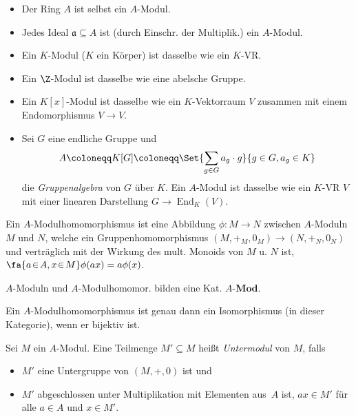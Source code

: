 \documentclass{cheat-sheet}
\newcommand{\Mod}{\mathbf{Mod}} %
\newcommand{\LMod}[1]{{#1}\text{-}\Mod} %
\DeclareMathOperator{\Hom}{Hom} %
\DeclareMathOperator{\End}{End} %
\newcommand{\aaa}{\mathfrak{a}}
\begin{document}
\begin{bspe}
  \begin{itemize}
    \item Der Ring $A$ ist selbst ein $A$-Modul.
    \item Jedes Ideal $\aaa \subseteq A$ ist (durch Einschr. der Multiplik.) ein $A$-Modul.
    \item Ein $K$-Modul ($K$ ein Körper) ist dasselbe wie ein $K$-VR.
    \item Ein $\Z$-Modul ist dasselbe wie eine abelsche Gruppe.
    \item Ein $K[x]$-Modul ist dasselbe wie ein $K$-Vektorraum $V$ zusammen mit einem Endomorphismus $V \to V$.
    \item Sei $G$ eine endliche Gruppe und
    \[
      A \coloneqq K[G] \coloneqq \Set{\sum_{g \in G} a_g \cdot g}{g \in G, a_g \in K}
    \]
    die \emph{Gruppenalgebra} von $G$ über $K$.
    Ein $A$-Modul ist dasselbe wie ein $K$-VR $V$ mit einer linearen Darstellung $G \to \End_K(V)$.
  \end{itemize}
\end{bspe}

\begin{defn}
  Ein $A$-Modulhomomorphismus ist eine Abbildung $\phi : M \to N$ zwischen $A$-Moduln $M$ und $N$, welche ein Gruppenhomomorphismus $(M, +_M, 0_M) \to (N, +_N, 0_N)$ und verträglich mit der Wirkung des mult. Monoids von $M$ u. $N$ ist, \dh{} $\fa{a \!\in\! A, x \!\in\! M} \phi(ax) = a \phi(x)$.
\end{defn}

\begin{bem}
  $A$-Moduln und $A$-Modulhomomor. bilden eine Kat. $\LMod{A}$.
\end{bem}

\begin{lem}
  Ein $A$-Modulhomomorphismus ist genau dann ein Isomorphismus (in dieser Kategorie), wenn er bijektiv ist.
\end{lem}



\begin{defn}
  Sei $M$ ein $A$-Modul.
  Eine Teilmenge $M' \subseteq M$ heißt \emph{Untermodul} von $M$, falls
  \begin{itemize}
    \item $M'$ eine Untergruppe von $(M, +, 0)$ ist und
    \item $M'$ abgeschlossen unter Multiplikation mit Elementen aus~$A$ ist, \dh{} $a x \in M'$ für alle $a \in A$ und $x \in M'$.
  \end{itemize}
\end{defn}
\end{document}
